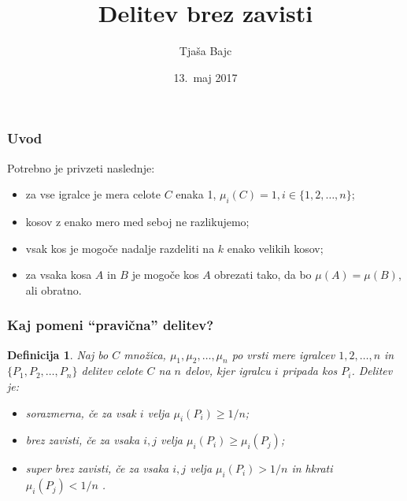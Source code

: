 \documentclass{beamer}
\title{Delitev brez zavisti}
\author{Tjaša Bajc}
\date{13.\ maj 2017}
\newtheorem{definicija}{Definicija}
\begin{document}

\begin{frame}
\titlepage
\end{frame}


\begin{frame}
\frametitle{Uvod}

Potrebno je privzeti naslednje:

\begin{itemize}
\item za vse igralce je mera celote $C$ enaka 1, $\mu_i(C) = 1, i \in \{1, 2, \ldots, n\}$;
\item kosov z enako mero med seboj ne razlikujemo; 
\item vsak kos je mogoče nadalje razdeliti na $k$ enako velikih kosov;
\item za vsaka kosa $A$ in $B$ je mogoče kos $A$ obrezati tako, da bo $\mu(A) = \mu(B)$, ali obratno.							
\end{itemize}

\end{frame}


\begin{frame}
\frametitle{Kaj pomeni ``pravična'' delitev?}

\begin{definicija}
Naj bo $C$ množica, $\mu_1, \mu_2, \ldots, \mu_n$ po vrsti mere igralcev $1, 2, \ldots, n$ in $\{P_1, P_2, \ldots, P_n\}$ delitev celote $C$ na $n$ delov, kjer igralcu $i$ pripada kos $P_i$. Delitev je:

\begin{itemize}
\item {\em sorazmerna\/}, če za vsak $i$ velja $\mu_i(P_i) \geq 1/n$;
\item {\em brez zavisti\/}, če za vsaka $i, j$ velja $\mu_i(P_i) \geq \mu_i(P_j)$;
\item{\em super brez zavisti\/}, če za vsaka $i, j$ velja $\mu_i(P_i) > 1/n$ in hkrati $\mu_i(P_j) < 1/n$ .								
\end{itemize}

\end{definicija}

\end{frame}

\end{document}
